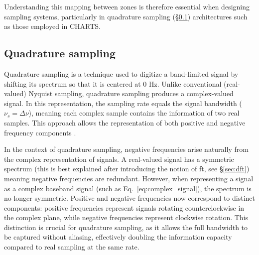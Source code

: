Understanding this mapping between zones is therefore essential when designing sampling systems, particularly in quadrature sampling (\S\ref{sec:quadrature_sampling}) architectures such as those employed in CHARTS.

\subsection{Quadrature sampling}
\label{sec:quadrature_sampling}
Quadrature sampling is a technique used to digitize a band-limited signal by shifting its spectrum so that it is centered at 0 Hz. Unlike conventional (real-valued) Nyquist sampling, quadrature sampling produces a complex-valued signal. In this representation, the sampling rate equals the signal bandwidth ($\nu_s = \Delta\nu$), meaning each complex sample contains the information of two real samples. This approach allows the representation of both positive and negative frequency components \citep{Price2016spectrometers}. 

In the context of quadrature sampling, negative frequencies arise naturally from the complex representation of signals. A real-valued signal has a symmetric spectrum (this is best explained after introducing the notion of \gls{ft}, see \S\ref{sec:dft}) meaning negative frequencies are redundant. However, when representing a signal as a complex baseband signal (such as Eq.\ \ref{eq:complex_signal}), the spectrum is no longer symmetric. Positive and negative frequencies now correspond to distinct components: positive frequencies represent signals rotating counterclockwise in the complex plane, while negative frequencies represent clockwise rotation. This distinction is crucial for quadrature sampling, as it allows the full bandwidth to be captured without aliasing, effectively doubling the information capacity compared to real sampling at the same rate.

